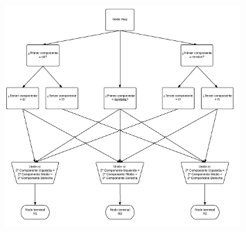 \documentclass[10pt, a4paper,spanish]{article}
\begin{document}
		\begin{figure}[H]
			\begin{center}
				\includegraphics[width=0.8\textwidth]{rete-graph}
			\end{center}
		\end{figure}
\end{document}
